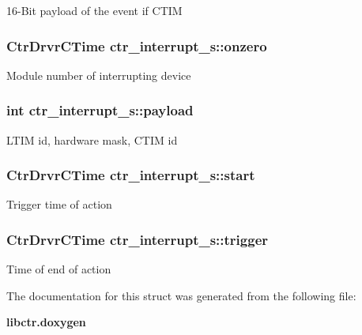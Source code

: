 16-Bit payload of the event if CTIM 
\subsubsection{\setlength{\rightskip}{0pt plus 5cm}Ctr\-Drvr\-CTime \bf{ctr\_\-interrupt\_\-s::onzero}}\label{structctr__interrupt__s_377a3326c3e1cf216ccec224c83949f9}


Module number of interrupting device 
\subsubsection{\setlength{\rightskip}{0pt plus 5cm}int \bf{ctr\_\-interrupt\_\-s::payload}}\label{structctr__interrupt__s_b8dfed84f6147e9ba75a4c11821d5c37}


LTIM id, hardware mask, CTIM id 
\subsubsection{\setlength{\rightskip}{0pt plus 5cm}Ctr\-Drvr\-CTime \bf{ctr\_\-interrupt\_\-s::start}}\label{structctr__interrupt__s_a8830a490998f7d172abdf1df5cdcb5c}


Trigger time of action 
\subsubsection{\setlength{\rightskip}{0pt plus 5cm}Ctr\-Drvr\-CTime \bf{ctr\_\-interrupt\_\-s::trigger}}\label{structctr__interrupt__s_db1b5bc3fcadd3fdc8b376206841eb48}


Time of end of action 

The documentation for this struct was generated from the following file:\begin{CompactItemize}
\item 
\bf{libctr.doxygen}\end{CompactItemize}
